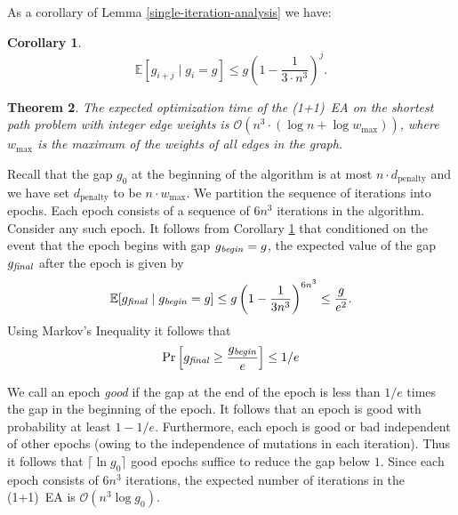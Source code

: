 \documentclass{sig-alternate}
\makeatletter
\newtheorem{thm}{Theorem}  %
\newtheorem{cor}[thm]{Corollary}
\newcommand{\oneoneea}{(1+1)~EA\xspace}
\newcommand{\Oh}{\ensuremath{\mathcal{O}}}
\newcommand{\E}{{\mathbb{E}}}   %
\DeclareRobustCommand{\qed}{\ifmmode\mathqed\else\leavevmode\unskip\penalty9999\hbox{}\nobreak\hfill\quad\hbox{\qedsymbol}\fi}
\let\QED@stack\@empty
\let\qed@elt\relax
\newcommand{\pushQED}[1]{\toks@{\qed@elt{#1}}\@temptokena\expandafter{\QED@stack}\xdef\QED@stack{\the\toks@\the\@temptokena}}
\newcommand{\popQED}{\begingroup\let\qed@elt\popQED@elt \QED@stack\relax\relax\endgroup}
\def\popQED@elt#1#2\relax{#1\gdef\QED@stack{#2}}
\newcommand{\mathqed}{\quad\hbox{\qedsymbol}}
\newcommand{\openbox}{\leavevmode\hbox to.77778em{\hfil\vrule\vbox to.675em{\hrule width.6em\vfil\hrule}\vrule\hfil}}
\providecommand{\qedsymbol}{\openbox}
\renewenvironment{proof}[1][\proofname]{\par\pushQED{\qed}\normalfont\topsep6\p@\@plus6\p@\relax\trivlist\item[\hskip\labelsep\itshape #1\@addpunct{.}]\ignorespaces}{\popQED\endtrivlist\@endpefalse}
\providecommand{\proofname}{Proof}
\makeatother
\begin{document}
\noindent

As a corollary of  Lemma \ref{single-iteration-analysis} we have:

\begin{cor}
  \[ 
  \E[g_{i+j}\mid g_i=g] \le g \left( 1-\frac{1}{3 \cdot n^3}\right)^j.
  \]
  \label{multiple-iteration-analysis}
\end{cor}



\begin{thm}
  The expected optimization time of the \oneoneea on the shortest path
  problem with integer edge weights is $\Oh\left(n^3 \cdot (\log n + \log
  {w_\mathrm{max}})\right)$, where $w_\mathrm{max}$ is the maximum of the
  weights of all edges in the graph.
\end{thm}
\begin{proof}
  Recall that the gap $g_0$ at the beginning of the algorithm is at
  most $n \cdot d_{\mathrm{penalty}}$ and we have set
  $d_\mathrm{penalty}$ to be $n \cdot w_{\mathrm{max}}$.
  We partition the sequence of iterations into epochs. Each epoch
  consists of a sequence of $6 n^3$ iterations in the
  algorithm. Consider any such epoch.
%
%
It follows from Corollary \ref{multiple-iteration-analysis} that
conditioned on the event that the epoch begins with gap $g_{\mathit{begin}}=g$,
the expected value of the gap $g_{\mathit{final}}$ after the epoch is given by
\[ 
\E[g_{\final}\mid g_{\beginn}=g] 
\leq g\left(1-\frac{1}{3n^3}\right)^{6n^3} 
\leq \frac{g}{e^2}.
\]
Using Markov's Inequality it follows that
\[ 
\Pr\left[g_{\mathit{final}} \ge \frac{g_{\mathit{begin}}}{e}\right] \leq 1/e
\]
 
We call an epoch \emph{good} if the gap at the end of the epoch is
less than $1/e$ times the gap in the beginning of the epoch. It
follows that an epoch is good with probability at least
$1-1/e$. Furthermore, each epoch is good or bad independent of other
epochs (owing to the independence of mutations in each iteration).
Thus it follows that $\lceil\ln g_0\rceil$ good epochs suffice to reduce the gap below $1$.
Since each epoch
consists of $6n^3$ iterations, the expected number of iterations in
the \oneoneea is $\Oh(n^3 \log g_0)$.
\end{proof}
\end{document}
